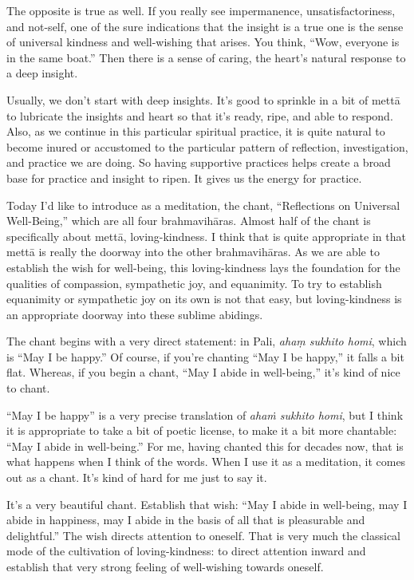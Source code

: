 The opposite is true as well. If you really see impermanence,
unsatisfactoriness, and not-self, one of the sure indications that the
insight is a true one is the sense of universal kindness and
well-wishing that arises. You think, “Wow, everyone is in the same
boat.” Then there is a sense of caring, the heart’s natural response to
a deep insight.

Usually, we don’t start with deep insights. It’s good to sprinkle in a
bit of mettā to lubricate the insights and heart so that it’s ready,
ripe, and able to respond. Also, as we continue in this particular
spiritual practice, it is quite natural to become inured or accustomed
to the particular pattern of reflection, investigation, and practice we
are doing. So having supportive practices helps create a broad base for
practice and insight to ripen. It gives us the energy for practice.

Today I’d like to introduce as a meditation, the chant, “Reflections on
Universal Well-Being,” which are all four brahmavihāras. Almost half of
the chant is specifically about mettā, loving-kindness. I think that is
quite appropriate in that mettā is really the doorway into the other
brahmavihāras. As we are able to establish the wish for well-being, this
loving-kindness lays the foundation for the qualities of compassion,
sympathetic joy, and equanimity. To try to establish equanimity or
sympathetic joy on its own is not that easy, but loving-kindness is an
appropriate doorway into these sublime abidings.

The chant begins with a very direct statement: in Pali, \emph{ahaṃ
sukhito homi}, which is “May I be happy.” Of course, if you’re chanting
“May I be happy,” it falls a bit flat. Whereas, if you begin a chant,
“May I abide in well-being,” it’s kind of nice to chant.

“May I be happy” is a very precise translation of \emph{ahaṁ sukhito
homi}, but I think it is appropriate to take a bit of poetic license, to
make it a bit more chantable: “May I abide in well-being.” For me,
having chanted this for decades now, that is what happens when I think
of the words. When I use it as a meditation, it comes out as a chant.
It’s kind of hard for me just to say it.

It’s a very beautiful chant. Establish that wish: “May I abide in
well-being, may I abide in happiness, may I abide in the basis of all
that is pleasurable and delightful.” The wish directs attention to
oneself. That is very much the classical mode of the cultivation of
loving-kindness: to direct attention inward and establish that very
strong feeling of well-wishing towards oneself.

